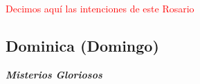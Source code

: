 \documentclass[10pt,twoside]{book}
\begin{document}
\begin{paracol}{2}
      \begin{leftcolumn*}
            
      \end{leftcolumn*}
      \begin{otherlanguage}{latin}
            \begin{rightcolumn}
                
            \end{rightcolumn}
      \end{otherlanguage}

      \begin{leftcolumn*}
            
      \end{leftcolumn*}
      \begin{otherlanguage}{latin}
            \begin{rightcolumn}
                
            \end{rightcolumn}
      \end{otherlanguage}
\end{paracol}

\vspace{0.5em}

\begin{center}
      \textcolor{red}{Decimos aquí las intenciones de este Rosario}
\end{center}

\begin{center}
      \section*{Dominica (Domingo)}

      \textbf{\textsl{\large Misterios Gloriosos}}
\end{center}

\vspace{0.5em}



\vspace{0.5em}



\vspace{0.75em}
\end{document}
